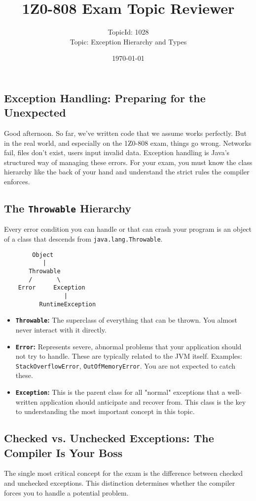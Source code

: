\documentclass[12pt]{article}
\title{\textbf{1Z0-808 Exam Topic Reviewer}}
\author{TopicId: 1028 \\ Topic: Exception Hierarchy and Types}
\date{\today}
\begin{document}
\maketitle
\newpage\begin{enumerate}[label=(\arabic*)]
\section*{Exception Handling: Preparing for the Unexpected}
Good afternoon. So far, we've written code that we assume works perfectly. But in the real world, and especially on the 1Z0-808 exam, things go wrong. Networks fail, files don't exist, users input invalid data. Exception handling is Java's structured way of managing these errors. For your exam, you must know the class hierarchy like the back of your hand and understand the strict rules the compiler enforces.

\subsection{The \texttt{Throwable} Hierarchy}
Every error condition you can handle or that can crash your program is an object of a class that descends from \texttt{java.lang.Throwable}.
\begin{verbatim}
        Object
           |
       Throwable
       /       \
    Error     Exception
                 |
          RuntimeException
\end{verbatim}
\begin{itemize}
    \item \textbf{\texttt{Throwable}:} The superclass of everything that can be thrown. You almost never interact with it directly.
    \item \textbf{\texttt{Error}:} Represents severe, abnormal problems that your application should not try to handle. These are typically related to the JVM itself. Examples: \texttt{StackOverflowError}, \texttt{OutOfMemoryError}. You are not expected to catch these.
    \item \textbf{\texttt{Exception}:} This is the parent class for all "normal" exceptions that a well-written application should anticipate and recover from. This class is the key to understanding the most important concept in this topic.
\end{itemize}

\subsection{Checked vs. Unchecked Exceptions: The Compiler Is Your Boss}
The single most critical concept for the exam is the difference between checked and unchecked exceptions. This distinction determines whether the compiler forces you to handle a potential problem.


\end{enumerate}
\end{document}

